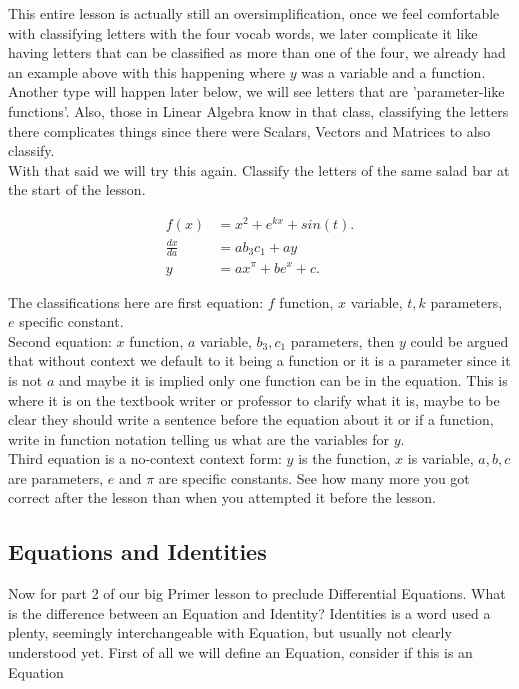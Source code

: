 \documentclass[12pt]{article}
\begin{document}
This entire lesson is actually still an oversimplification, once we feel comfortable with classifying letters with the four vocab words, we later complicate it like having letters that can be classified as more than one of the four, we already had an example above with this happening where $y$ was a variable and a function. Another type will happen later below, we will see letters that are 'parameter-like functions'. Also, those in Linear Algebra know in that class, classifying the letters there complicates things since there were Scalars, Vectors and Matrices to also classify. \\

With that said we will try this again. Classify the letters of the same salad bar at the start of the lesson.

\begin{align*}
    f(x) &= x^2+e^{kx}+sin(t). \\
    \frac{dx}{da} &= ab_3c_1+ay \\
    y &= ax^\pi+be^x+c.
\end{align*}

The classifications here are first equation: $f$ function, $x$ variable, $t,k$ parameters, $e$ specific constant. \\

Second equation: $x$ function, $a$ variable, $b_3,c_1$ parameters, then $y$ could be argued that without context we default to it being a function or it is a parameter since it is not $a$ and maybe it is implied only one function can be in the equation. This is where it is on the textbook writer or professor to clarify what it is, maybe to be clear they should write a sentence before the equation about it or if a function, write in function notation telling us what are the variables for $y$. \\

Third equation is a no-context context form: $y$ is the function, $x$ is variable, $a,b,c$ are parameters, $e$ and $\pi$ are specific constants. See how many more you got correct after the lesson than when you attempted it before the lesson. 

\subsection{Equations and Identities}

Now for part 2 of our big Primer lesson to preclude Differential Equations. What is the difference between an Equation and Identity? Identities is a word used a plenty, seemingly interchangeable with Equation, but usually not clearly understood yet. First of all we will define an Equation, consider if this is an Equation
\end{document}
